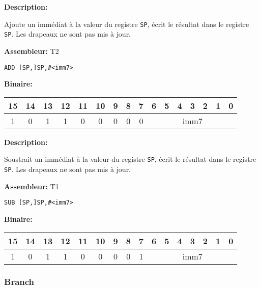 \documentclass{article}
\newcounter{subsubsubsection}[subsubsection]
\begin{document}

\textbf{Description: }

Ajoute un immédiat à la valeur du registre \texttt{SP}, écrit le résultat dans le registre \texttt{SP}.
Les drapeaux ne sont pas mis à jour.

\textbf{Assembleur:} T2

\begin{lstlisting}
ADD [SP,]SP,#<imm7>
\end{lstlisting}

\textbf{Binaire:}\\

\begin{tabular}{| c c c c c c c c c c c c c c c c |}
\hline
15 & 14 & 13 & 12 & \multicolumn{1}{|c}{11} & 10 & 9 & 8 & \multicolumn{1}{|c}{7} & \multicolumn{1}{|c}{6} & 5 & 4 & 3 & 2 & 1 & 0 \\
\hline
1 & 0 & 1 & 1 & \multicolumn{1}{|c}{0} & 0 & 0 & 0 & \multicolumn{1}{|c}{0} & \multicolumn{7}{|c|}{imm7} \\
\hline
\end{tabular}


\textbf{Description: }

Soustrait un immédiat à la valeur du registre \texttt{SP}, écrit le résultat dans le registre \texttt{SP}.
Les drapeaux ne sont pas mis à jour.

\textbf{Assembleur:} T1

\begin{lstlisting}
SUB [SP,]SP,#<imm7>
\end{lstlisting}



\textbf{Binaire:}\\

\begin{tabular}{| c c c c c c c c c c c c c c c c |}
\hline
15 & 14 & 13 & 12 & \multicolumn{1}{|c}{11} & 10 & 9 & 8 & \multicolumn{1}{|c}{7} & \multicolumn{1}{|c}{6} & 5 & 4 & 3 & 2 & 1 & 0 \\
\hline
1 & 0 & 1 & 1 & \multicolumn{1}{|c}{0} & 0 & 0 & 0 & \multicolumn{1}{|c}{1} & \multicolumn{7}{|c|}{imm7} \\
\hline
\end{tabular}



\subsubsection{Branch}
\end{document}
